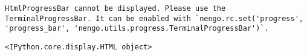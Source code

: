 \documentclass[11pt]{article}
\newcommand{\prompt}[4]{
        \llap{{\color{#2}[#3]: #4}}\vspace{-1.25em}
    }
\begin{document}
    
    
    
    
    \begin{verbatim}
HtmlProgressBar cannot be displayed. Please use the TerminalProgressBar. It can be enabled with `nengo.rc.set('progress', 'progress_bar', 'nengo.utils.progress.TerminalProgressBar')`.
    \end{verbatim}

    
    
    
            \begin{tcolorbox}[breakable, boxrule=.5pt, size=fbox, pad at break*=1mm, opacityfill=0]
\prompt{Out}{outcolor}{25}{\hspace{3.5pt}}
\begin{Verbatim}[commandchars=\\\{\}]
<IPython.core.display.HTML object>
\end{Verbatim}
\end{tcolorbox}
        
    \begin{center}
    \end{center}
    { \hspace*{\fill} \\}
    

    
    
    
    
\end{document}
